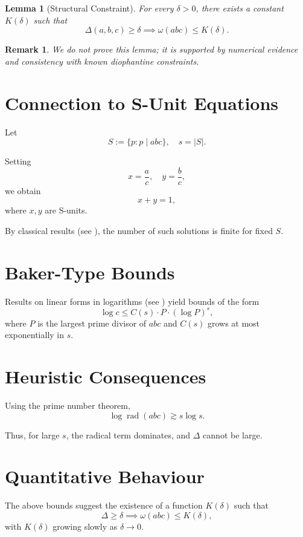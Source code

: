 \documentclass{article}
\newtheorem{lemma}{Lemma}
\newtheorem{remark}{Remark}
\newcommand{\rad}{\operatorname{rad}}
\begin{document}
	\begin{lemma}[Structural Constraint]
		For every $\delta>0$, there exists a constant $K(\delta)$ such that
		\[
		\Delta(a,b,c) \ge \delta \implies \omega(abc) \le K(\delta).
		\]
	\end{lemma}
	
	\begin{remark}
		We do not prove this lemma; it is supported by numerical evidence
		and consistency with known diophantine constraints.
	\end{remark}
	
	\section{Connection to S-Unit Equations}
	
	Let
	\[
	S := \{p : p \mid abc\}, \quad s = |S|.
	\]
	
	Setting
	\[
	x = \frac{a}{c}, \quad y = \frac{b}{c},
	\]
	we obtain
	\[
	x + y = 1,
	\]
	where $x,y$ are S-units.
	
	By classical results (see \cite{EvertseGyory}),
	the number of such solutions is finite for fixed $S$.
	
	\section{Baker-Type Bounds}
	
	Results on linear forms in logarithms (see \cite{BakerWustholz})
	yield bounds of the form
	\[
	\log c \le C(s) \cdot P \cdot (\log P)^s,
	\]
	where $P$ is the largest prime divisor of $abc$ and $C(s)$ grows at most exponentially in $s$.
	
	\section{Heuristic Consequences}
	
	Using the prime number theorem,
	\[
	\log \rad(abc) \gtrsim s \log s.
	\]
	
	Thus, for large $s$, the radical term dominates, and $\Delta$ cannot be large.
	
	\section{Quantitative Behaviour}
	
	The above bounds suggest the existence of a function $K(\delta)$
	such that
	\[
	\Delta \ge \delta \implies \omega(abc) \le K(\delta),
	\]
	with $K(\delta)$ growing slowly as $\delta \to 0$.
	
\end{document}
